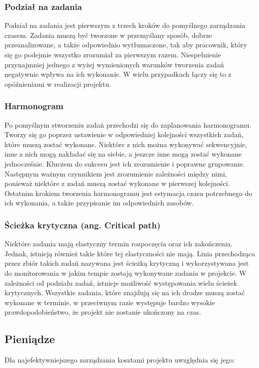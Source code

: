 \documentclass[oneside,polski,logo]{amuthesis}
\begin{document}
\subsubsection {Podział na zadania}
Podział na zadania jest pierwszym z trzech kroków do pomyślnego zarządzania czasem. Zadania muszą być tworzone w przemyślany sposób, dobrze przeanalizowane, a także odpowiednio wytłumaczone, tak aby pracownik, który się go podejmie wszystko zrozumiał za pierwszym razem. Niespełnienie przynajmniej jednego z wyżej wymienionych warunków tworzenia zadań negatywnie wpływa na ich wykonanie. W wielu przypadkach łączy się to z opóźnieniami w realizacji projektu.

\subsubsection {Harmonogram}
Po pomyślnym stworzeniu zadań przechodzi się do zaplanowania harmonogramu. Tworzy się go poprzez ustawienie w odpowiedniej kolejności wszystkich zadań, które muszą zostać wykonane. Niektóre z nich można wykonywać sekwencyjnie, inne z nich mogą nakładać się na siebie, a jeszcze inne mogą zostać wykonane jednocześnie. Kluczem do sukcesu jest ich zrozumienie i poprawne grupowanie. Następnym ważnym czynnikiem jest zrozumienie zależności między nimi, ponieważ niektóre z zadań muszą zostać wykonane w pierwszej kolejności. Ostatnim krokiem tworzenia harmonogramu jest estymacja czasu potrzebnego do ich wykonania, a także przypisanie im odpowiednich zasobów. 

\subsubsection {Ścieżka krytyczna (ang. Critical path)}
Niektóre zadania mają elastyczny termin rozpoczęcia oraz ich zakończenia. Jednak, istnieją również takie które tej elastyczności nie mają. Linia przechodząca przez zbiór takich zadań nazywana jest ścieżką krytyczną i wykorzystywana jest do monitorowania w jakim tempie zostają wykonywane zadania w projekcie. W zależności od podziału zadań, istnieje możliwość występowania wielu ścieżek krytycznych. Wszystkie zadania, które znajdują się na ich drodze muszą zostać wykonane w terminie, w przeciwnym razie występuje bardzo wysokie prawdopodobieństwo, że projekt nie zostanie ukończony na czas.

\subsection {Pieniądze}
Dla najefektywniejszego zarządzania kosztami projektu uwzględnia się jego:
\end{document}
